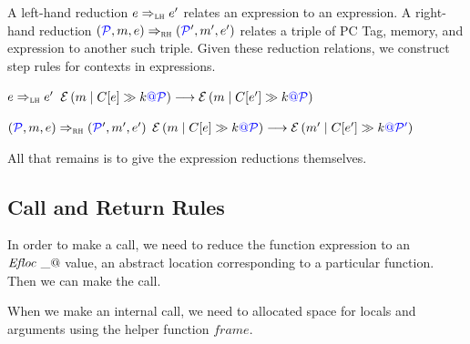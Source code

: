\documentclass{llncs}
\begin{document}
A left-hand reduction \(e \Rightarrow_{\textnormal{\sc lh}} e'\)
relates an expression to an expression. A right-hand reduction
\((\mathcal{\color{blue} P\mathit{}},m,e) \Rightarrow_{\textnormal{\sc rh}} (\mathcal{\color{blue} P\mathit{}}',m',e')\)
relates a triple of PC Tag, memory, and expression to another such triple.
Given these reduction relations, we construct step rules for contexts in
expressions.


\judgmenttwo{\(\ctx{\expr}_\lh\)}
            {\(e \Rightarrow_{\textnormal{\sc lh}} e'\)}
            {\(\mathcal{E}\left(m \mid C \!\left[e\right] \gg k {\color{blue} @ \mathcal{\color{blue} P\mathit{}}}\right) \longrightarrow \mathcal{E}\left(m \mid C \!\left[e'\right] \gg k {\color{blue} @ \mathcal{\color{blue} P\mathit{}}}\right)\)}

\judgmenttwo{\(\ctx{\expr}_\rh\)}
            {\((\mathcal{\color{blue} P\mathit{}}, m, e) \Rightarrow_{\textnormal{\sc rh}} (\mathcal{\color{blue} P\mathit{}}', m', e')\)}
            {\(\mathcal{E}\left(m \mid C \!\left[e\right] \gg k {\color{blue} @ \mathcal{\color{blue} P\mathit{}}}\right) \longrightarrow \mathcal{E}\left(m' \mid C \!\left[e'\right] \gg k {\color{blue} @ \mathcal{\color{blue} P\mathit{}}'}\right)\)}
            
All that remains is to give the expression reductions themselves.

\expressions

\subsection{Call and Return Rules}

In order to make a call, we need to reduce the function expression to an \(\mathit{Efloc} ~ \_@\) value, an
abstract location corresponding to a particular function. Then we can make the call.

\callexprstep

When we make an internal call, we need to allocated space for locals and arguments using the helper function
\(\mathit{frame}\).
\end{document}
